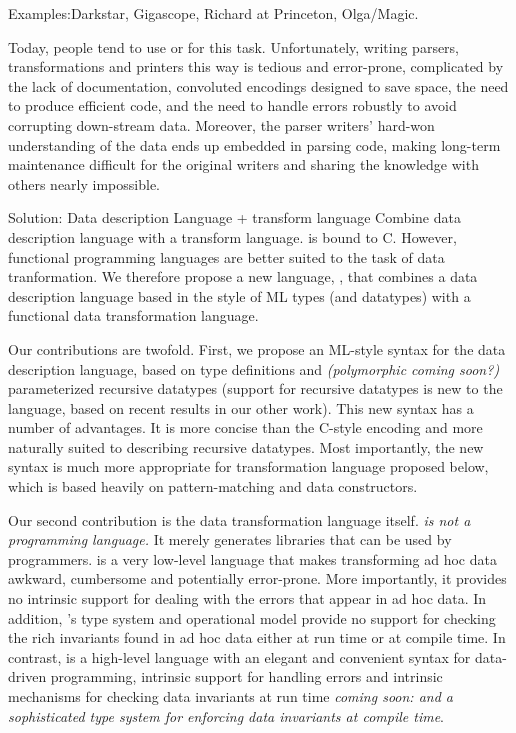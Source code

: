 \documentclass{entcs}
\begin{document}
Examples:Darkstar, Gigascope, Richard at Princeton, Olga/Magic.

Today, people tend to use \C{} or \perl{} for this task.
Unfortunately, writing parsers, transformations and printers this way
is tedious and error-prone, complicated by the lack of documentation,
convoluted encodings designed to save space, the need to produce
efficient code, and the need to handle errors robustly to avoid
corrupting down-stream data.  Moreover, the parser writers' hard-won
understanding of the data ends up embedded in parsing code, making
long-term maintenance difficult for the original writers and sharing
the knowledge with others nearly impossible.

Solution: Data description Language + transform language
Combine data description language with a transform language.
\pads{} is bound to C. However, functional programming languages are
better suited to the task of data tranformation. We therefore propose
a new language, \datatype{}, that combines a data description language
based in the style of ML types (and datatypes) with a functional data
transformation language. 

Our contributions are twofold. First, we propose an ML-style syntax
for the \pads{} data description language, based on type definitions
and {\em(polymorphic coming soon?)} parameterized recursive datatypes
(support for recursive datatypes is new to the \pads{} language, based
on recent results in our other work). This new syntax has a number of
advantages. It is more concise than the C-style encoding and more
naturally suited to describing recursive datatypes. Most importantly,
the new syntax is much more appropriate for transformation language
proposed below, which is based heavily on pattern-matching and data
constructors.

Our second contribution is the data transformation language itself.
{\em \pads{} is not a programming language.}  It merely generates
libraries that can be used by \C{} programmers.  \C{} is a very
low-level language that makes transforming ad hoc data awkward,
cumbersome and potentially error-prone.  More importantly, it provides
no intrinsic support for dealing with the errors that appear in ad hoc
data.  In addition, \C's type system and operational model provide no
support for checking the rich invariants found in ad hoc data either
at run time or at compile time.  In contrast, \datatype{} is a
high-level language with an elegant and convenient syntax for
data-driven programming, intrinsic support for handling errors and
intrinsic mechanisms for checking data invariants at run time {\em
  coming soon: and a sophisticated type system for enforcing data
  invariants at compile time}. 
\end{document}

